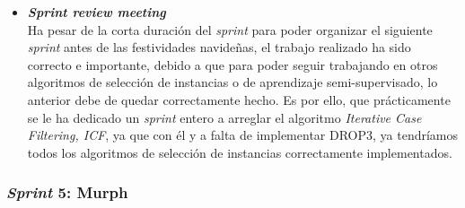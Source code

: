 \begin{itemize}
\item \textbf{\textit{Sprint review meeting}}\\
Ha pesar de la corta duración del \textit{sprint} para poder organizar el siguiente \textit{sprint} antes de las festividades navideñas, el trabajo realizado ha sido correcto e importante, debido a que para poder seguir trabajando en otros algoritmos de selección de instancias o de aprendizaje semi-supervisado, lo anterior debe de quedar correctamente hecho. Es por ello, que prácticamente se le ha dedicado un \textit{sprint} entero a arreglar el algoritmo \textit{Iterative Case Filtering, ICF}, ya que con él y a falta de implementar DROP3, ya tendríamos todos los algoritmos de selección de instancias correctamente implementados.
\end{itemize}
\vfill
\subsubsection{\textit{Sprint} 5: Murph}
